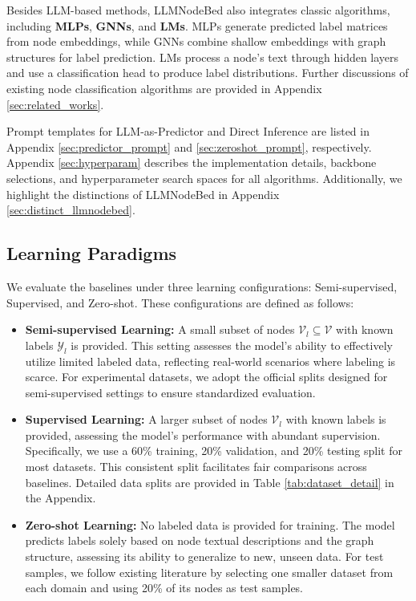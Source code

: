 Besides LLM-based methods, LLMNodeBed also integrates classic algorithms, including \textbf{MLPs}, \textbf{GNNs}, and \textbf{LMs}. MLPs generate predicted label matrices from node embeddings, while GNNs combine shallow embeddings with graph structures for label prediction. LMs process a node's text through hidden layers and use a classification head to produce label distributions. Further discussions of existing node classification algorithms are provided in Appendix \ref{sec:related_works}.

Prompt templates for LLM-as-Predictor and Direct Inference are listed in Appendix \ref{sec:predictor_prompt} and \ref{sec:zeroshot_prompt}, respectively. Appendix \ref{sec:hyperparam} describes the implementation details, backbone selections, and hyperparameter search spaces for all algorithms. Additionally, we highlight the distinctions of LLMNodeBed in Appendix \ref{sec:distinct_llmnodebed}.





\subsection{Learning Paradigms}

We evaluate the baselines under three learning configurations: Semi-supervised, Supervised, and Zero-shot. These configurations are defined as follows:

\begin{itemize}
    \item \textbf{Semi-supervised Learning:} A small subset of nodes $\mathcal{V}_l \subseteq \mathcal{V}$ with known labels $\mathcal{Y}_l$ is provided. This setting assesses the model's ability to effectively utilize limited labeled data, reflecting real-world scenarios where labeling is scarce. For experimental datasets, we adopt the official splits designed for semi-supervised settings to ensure standardized evaluation.
   
    \item \textbf{Supervised Learning:} A larger subset of nodes $\mathcal{V}_l$ with known labels is provided, assessing the model's performance with abundant supervision. Specifically, we use a 60\% training, 20\% validation, and 20\% testing split for most datasets. This consistent split facilitates fair comparisons across baselines. Detailed data splits are provided in Table \ref{tab:dataset_detail} in the Appendix.
    
    \item \textbf{Zero-shot Learning:} No labeled data is provided for training. The model predicts labels solely based on node textual descriptions and the graph structure, assessing its ability to generalize to new, unseen data. For test samples, we follow existing literature \cite{Zhu2024GraphCLIPET} by selecting one smaller dataset from each domain and using 20\% of its nodes as test samples.
\end{itemize}
